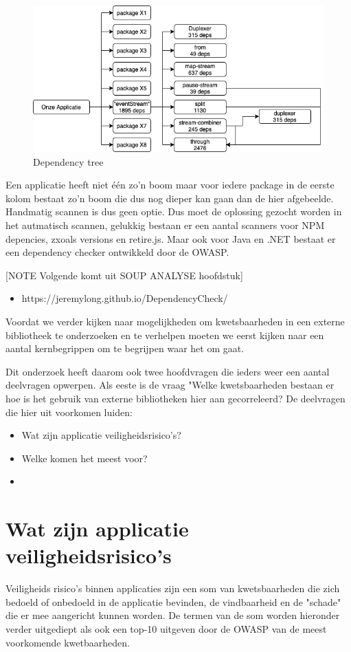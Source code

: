 \begin{figure}[H]
    \myfloatalign
    \includegraphics[width=12cm]{gfx/dependency-tree}
    \caption{Dependency tree}\label{fig:dependency-tree}
\end{figure}
Een applicatie heeft niet één zo'n boom maar voor iedere package in de eerste kolom bestaat zo'n boom die dus nog dieper kan gaan dan de hier afgebeelde.
Handmatig scannen is dus geen optie.
Dus moet de oplossing gezocht worden in het autmatisch scannen, gelukkig bestaan er een aantal scanners voor NPM depencies, zxoals versions en retire.js.
Maar ook voor Java en .NET bestaat er een dependency checker ontwikkeld door de OWASP\@.


[NOTE Volgende komt uit SOUP ANALYSE hoofdstuk]


\begin{itemize}
    \item https://jeremylong.github.io/DependencyCheck/
\end{itemize}

Voordat we verder kijken naar mogelijkheden om kwetsbaarheden in een externe bibliotheek te onderzoeken en te verhelpen moeten we eerst kijken naar een aantal kernbegrippen om te begrijpen waar het om gaat.

Dit onderzoek heeft daarom ook twee hoofdvragen die ieders weer een aantal deelvragen opwerpen.
Als eeste is de vraag "Welke kwetsbaarheden bestaan er hoe is het gebruik van externe bibliotheken hier aan gecorreleerd?
De deelvragen die hier uit voorkomen luiden:
\begin{itemize}
    \item Wat zijn applicatie veiligheidsrisico's?
    \item Welke komen het meest voor?
    \item
\end{itemize}

\section{Wat zijn applicatie veiligheidsrisico's}\label{sec:wat-zijn-applicatie-veiligheids-risico's}
Veiligheids risico's binnen applicaties zijn een som van kwetsbaarheden die zich bedoeld of onbedoeld in de applicatie bevinden, de vindbaarheid en de "schade" die er mee aangericht kunnen worden.
De termen van de som worden hieronder verder uitgediept als ook een top-10 uitgeven door de OWASP van de meest voorkomende kwetbaarheden.

